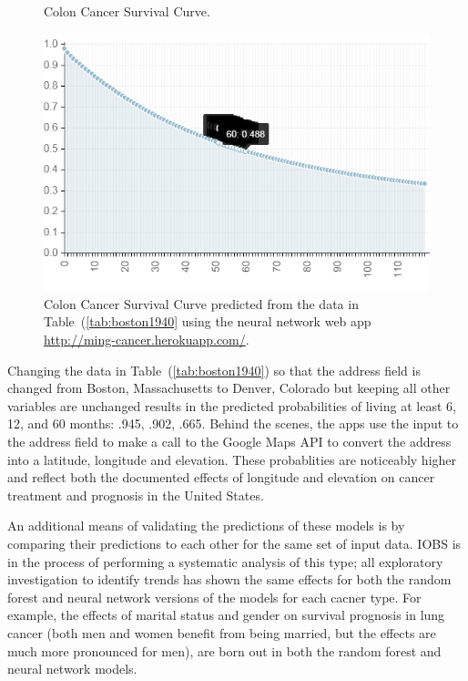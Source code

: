 \documentclass[a4paper,11pt]{article}
\begin{document}
\begin{figure}[!ht]
 \caption{Colon Cancer Survival Curve.}
  \label{fig:boston1940}
  \centering
    \includegraphics[scale=.5]{boston1940}
\caption{\label{fig:boston1940} Colon Cancer Survival Curve predicted from the data in 
Table~(\ref{tab:boston1940} using the neural network web app \url{http://ming-cancer.herokuapp.com/}.}
\end{figure}









Changing the data in Table~(\ref{tab:boston1940}) so that the address field is changed from Boston, Massachusetts to Denver, Colorado but keeping all other variables are unchanged results in the predicted probabilities of living at least 6, 12, and 60 months: .945, .902, .665. 
Behind the scenes, the apps use the input to the address field to make a call to the Google Maps API to convert the address into a latitude, longitude and elevation.
These probablities are noticeably higher and reflect both the documented effects of longitude and elevation on cancer treatment and prognosis in the United States.

An additional means of validating the predictions of these models is by comparing their predictions to each other for the same set of input data. IOBS is in the process of performing a systematic analysis of this type; all exploratory investigation to identify trends has shown the same effects for both the random forest and neural network versions of the models for each cacner type. For example, the effects of marital status and gender on survival prognosis in lung cancer (both men and women benefit from being married, but the effects are much more pronounced for men), are born out in both the random forest and neural network models. 
\end{document}
